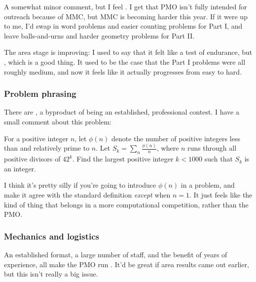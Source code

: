 \documentclass[11pt,paper=letter]{scrartcl}
\begin{document}
A somewhat minor comment, but I feel . I get that PMO isn't fully intended for outreach because of MMC, but MMC is becoming harder this year. If it were up to me, I'd swap in word problems and easier counting problems for Part I, and leave balls-and-urns and harder geometry problems for Part II.

The area stage is improving: I used to say that it felt like a test of endurance, but , which is a good thing. It used to be the case that the Part I problems were all roughly medium, and now it feels like it actually progresses from easy to hard.

\subsubsection*{Problem phrasing}

There are , a byproduct of being an established, professional contest. I have a small comment about this problem:

\begin{probboxed}
  [Areas II1] For a positive integer $n$, let $\phi(n)$ denote the number of positive integers less than and relatively prime to $n$. Let $\displaystyle S_k = \sum_n \frac{\phi(n)}{n}$, where $n$ runs through all positive divisors of $42^k$. Find the largest positive integer $k < 1000$ such that $S_k$ is an integer.
\end{probboxed}

I think it's pretty silly if you're going to introduce $\phi(n)$ in a problem, and make it agree with the standard definition \emph{except} when $n = 1$. It just feels like the kind of thing that belongs in a more computational competition, rather than the PMO.

\subsubsection*{Mechanics and logistics}

An established format, a large number of staff, and the benefit of years of experience, all make the PMO run . It'd be great if area results came out earlier, but this isn't really a big issue.

\end{document}
